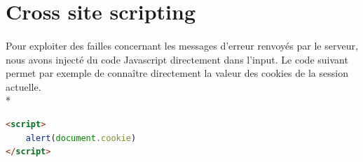 \documentclass{article}
\begin{document}

\section{Cross site scripting}

\paragraph{}
Pour exploiter des failles concernant les messages d'erreur renvoy\'{e}s par le serveur, nous avons inject\'{e} du code Javascript directement dans l'input. Le code suivant permet par exemple de connaître directement la valeur des cookies de la session actuelle.\\*
\begin{tcolorbox}
\begin{lstlisting}[language=html]
<script>
	alert(document.cookie)
</script>
\end{lstlisting}
\end{tcolorbox}
\end{document}

